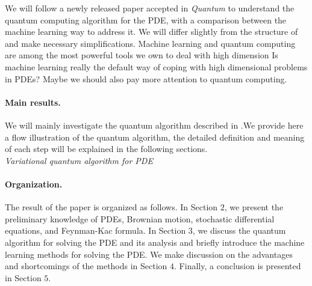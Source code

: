 \documentclass[11pt]{article}
\theoremstyle{definition}
\begin{document}
We will follow a newly released paper \cite{alghassi_variational_2022} accepted in \textit{Quantum} to understand the quantum computing algorithm for the  PDE, with a comparison between the machine learning way to address it. We will differ slightly from the structure of and make necessary simplifications. Machine learning and quantum computing are among the most powerful tools we own to deal with high dimension  Is machine learning really the default way of coping with high dimensional problems in PDEs? Maybe we should also pay more attention to quantum computing. 



\paragraph{Main results.}
We will mainly investigate the quantum algorithm described in .We provide here a flow illustration of the quantum algorithm, the detailed definition and meaning of each step will be explained in the following sections. \\

\textit{Variational quantum algorithm for PDE}




\paragraph{Organization.}
The result of the paper is organized as follows. In Section $2$, we present the preliminary knowledge of PDEs, Brownian motion, stochastic differential equations, and Feynman-Kac formula. In Section $3$, we discuss the quantum algorithm for solving the PDE and its analysis and briefly introduce the machine learning methods for solving the PDE. We make discussion on the advantages and shortcomings of the methods in Section $4$. Finally, a conclusion is presented in Section $5$.

\end{document}
